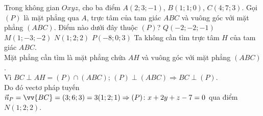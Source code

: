 \begin{ex}%
	Trong không gian $O x y z$, cho ba điểm $A(2;3;-1)$, $B(1;1;0)$, $C(4;7;3)$. Gọi $(P)$ là mặt phẳng qua $A$, trực tâm của tam giác $ABC$ và vuông góc với mặt phẳng $(ABC)$. Điểm nào dưới đây thuộc $(P)$?
	\choice 
	{$Q(-2;-2;-1)$}
	{$M(1;-3;-2)$}
	{$N(1;2;2)$\True}
	{$P(-8;0;3)$}
	\loigiai
	{
Ta không cần tìm trực tâm $H$ của tam giác $ABC$.\\
Mặt phẳng cần tìm là mặt phẳng chứa $AH$ và vuông góc với mặt phẳng $(ABC)$.\\ 
Vì $BC\perp AH=(P)\cap (ABC)$; $(P)\perp(ABC)\Rightarrow BC\perp (P)$.\\
Do đó vectơ pháp tuyến $\vec{n}_P=\vv{BC}=(3;6;3)=3 (1;2;1)\Rightarrow (P)\colon x+2y+z-7=0$ qua điểm $N(1;2;2)$.
}
\end{ex}


